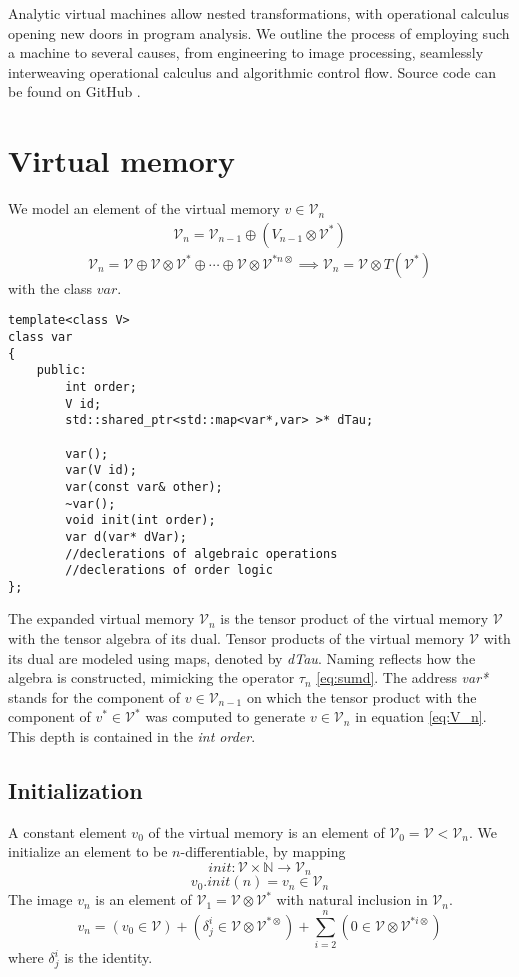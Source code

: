 \documentclass{article}
\newcommand{\VV}{\mathcal{V}}
\newcommand{\sumd}{\tau}
\begin{document}
Analytic virtual machines allow nested transformations, with operational calculus opening new doors in program analysis. We outline the process of employing such a machine to several causes, from engineering to image processing, seamlessly interweaving operational calculus and algorithmic control flow. Source code can be found on GitHub \cite{dCpp}.

\section{Virtual memory}\label{sec:virtualMemory}

We model an element of the virtual memory $v\in\VV_n$ \cite[Definition~7]{OperationalCalculus}
\begin{eqnarray}
\VV_{n}=\VV_{n-1}\oplus(V_{n-1}\otimes\VV^*) \label{eq:V_n}
\end{eqnarray}
\begin{equation}
\VV_{n}=\VV\oplus\VV\otimes\VV^*\oplus\cdots\oplus\VV\otimes\VV^{*n\otimes} \implies\VV_n=\VV\otimes T(\VV^*)
\end{equation}
with the class $var$.

\begin{lstlisting}
template<class V>
class var
{
    public:
    	int order;
        V id;
        std::shared_ptr<std::map<var*,var> >* dTau;

        var();
        var(V id);
        var(const var& other);
        ~var();
        void init(int order);
        var d(var* dVar);
        //declerations of algebraic operations
        //declerations of order logic
};
\end{lstlisting}

The expanded virtual memory $\VV_n$ is the tensor product of the virtual memory $\VV$ with the tensor algebra of its dual. Tensor products of the virtual memory $\VV$ with its dual are modeled using maps, denoted by \emph{dTau}. Naming reflects how the algebra is constructed, mimicking the operator $\sumd_n$ \eqref{eq:sumd}. The address \emph{var*} stands for the component of $v\in\VV_{n-1}$ on which the tensor product with the component of $v^*\in\VV^*$ was computed to generate $v\in\VV_n$ in equation \eqref{eq:V_n}. This depth is contained in the \emph{int order}.

\subsection{Initialization}

A constant element $v_0$ of the virtual memory is an element of $\VV_0=\VV<\VV_n$. We initialize an element to be $n$-differentiable, by mapping
\begin{equation}
init:\VV\times\mathbb{N}\to\VV_n
\end{equation}
\begin{equation}
v_0.init(n)=v_n\in\VV_n
\end{equation}
The image $v_n$ is an element of $\VV_1=\VV\otimes\VV^*$ with natural inclusion in $\VV_n$.
\begin{equation}
v_n=(v_0\in\VV)+(\delta^i_j\in\VV\otimes\VV^ {*\otimes})+\sum\limits_{i=2}^n(0\in\VV\otimes\VV^ {*i\otimes})
\end{equation}
where $\delta^i_j$ is the identity.
\end{document}
